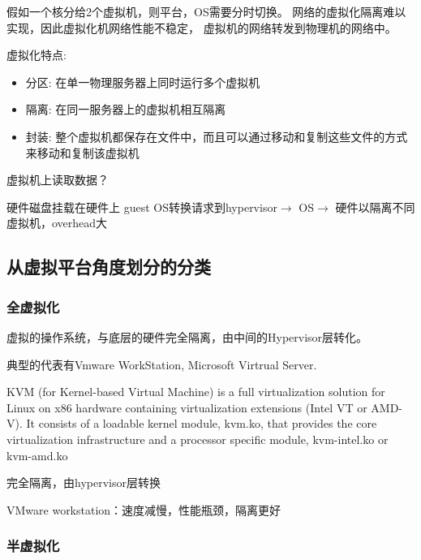 假如一个核分给2个虚拟机，则平台，OS需要分时切换。️ 网络的虚拟化隔离难以实现，因此虚拟化机网络性能不稳定， 虚拟机的网络转发到物理机的网络中。

虚拟化特点:

\begin{itemize}
    \item 分区: 在单一物理服务器上同时运行多个虚拟机
    \item 隔离: 在同一服务器上的虚拟机相互隔离
    \item 封装: 整个虚拟机都保存在文件中，而且可以通过移动和复制这些文件的方式来移动和复制该虚拟机
\end{itemize}

虚拟机上读取数据？ 

硬件磁盘挂载在硬件上 guest OS转换请求到hypervisor$\rightarrow$ OS$\rightarrow$ 硬件以隔离不同虚拟机，overhead大

\subsection{从虚拟平台角度划分的分类}

\subsubsection{全虚拟化}

\begin{definition}[全虚拟化]
    虚拟的操作系统，与底层的硬件完全隔离，由中间的Hypervisor层转化。 
    
    典型的代表有Vmware WorkStation, Microsoft Virtrual Server. 
\end{definition}

\begin{definition}[KVM]
    KVM (for Kernel-based Virtual Machine) is a full virtualization solution for Linux on x86 hardware containing virtualization extensions (Intel VT or AMD-V). It consists of a loadable kernel module, kvm.ko, that provides the core virtualization infrastructure and a processor specific module, kvm-intel.ko or kvm-amd.ko
\end{definition}

完全隔离，由hypervisor层转换 

VMware workstation：速度减慢，性能瓶颈，隔离更好

\subsubsection{半虚拟化}

